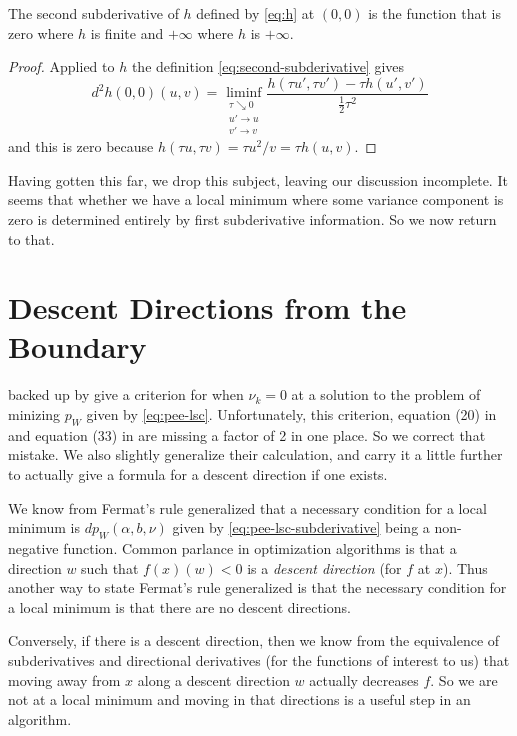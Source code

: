 \begin{theorem} \label{th:second-subderivative}
The second subderivative of $h$ defined by \eqref{eq:h} at $(0, 0)$ is
the function that is zero where $h$ is finite and $+\infty$
where $h$ is $+\infty$.
\end{theorem}
\begin{proof}
Applied to $h$ the definition \eqref{eq:second-subderivative} gives
\begin{equation*}
   d^2 h(0, 0)(u, v)
   = \liminf_{\substack{\tau \searrow 0 \\ u' \to u \\ v' \to v}}
   \frac{h(\tau u', \tau v') - \tau h(u', v')}{\frac{1}{2} \tau^2}
\end{equation*}
and this is zero because $h(\tau u, \tau v) = \tau u^2 / v = \tau h(u, v)$.
\end{proof}

Having gotten this far, we drop this subject, leaving our discussion
incomplete.  It seems that whether we have a local minimum where some
variance component is zero is determined entirely by first subderivative
information.  So we now return to that.

\section{Descent Directions from the Boundary}
\label{sec:descent-directions}

\citet[Section~4]{reaster} backed up by \citet[Section~1.10.4]{reaster-tr}
give a criterion for when $\nu_k = 0$ at a solution to the problem of minizing
$p_W$ given by \eqref{eq:pee-lsc}.  Unfortunately, this criterion,
equation (20) in \citet{reaster} and equation (33)  in \citet{reaster-tr}
are missing a factor of {2} in one place.
So we correct that mistake.
We also slightly generalize their calculation,
and carry it a little further to actually give a formula for a descent
direction if one exists.

We know from Fermat's rule generalized that a necessary condition for
a local minimum is $d p_W(\alpha, b, \nu)$
given by \eqref{eq:pee-lsc-subderivative} being a non-negative function.
Common parlance in optimization algorithms is that a direction $w$ such
that $f(x)(w) < 0$ is a \emph{descent direction} (for $f$ at $x$).
Thus another way to state Fermat's rule generalized is that the necessary
condition for a local minimum is that there are no descent directions.

Conversely, if there is a descent direction, then we know from the
equivalence of subderivatives and directional derivatives (for the
functions of interest to us) that moving away from $x$ along a descent
direction $w$ actually decreases $f$.  So we are not at a local minimum
and moving in that directions is a useful step in an algorithm.

